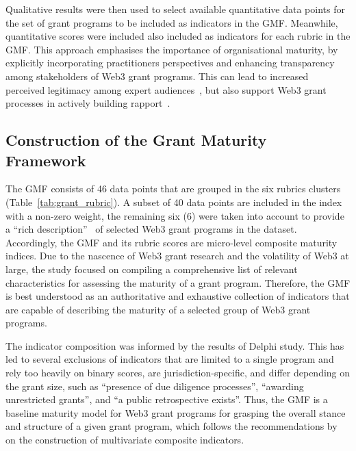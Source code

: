 \documentclass[conference]{IEEEtran}
\begin{document}
Qualitative results were then used to select available quantitative data points for the set of grant programs to be included as indicators in the GMF. Meanwhile, quantitative scores were included also included as indicators for each rubric in the GMF. This approach emphasises the importance of organisational maturity, by explicitly incorporating practitioners perspectives and enhancing transparency among stakeholders of Web3 grant programs. This can lead to increased perceived legitimacy among expert audiences~\cite[p.~116]{curtin_does_2006}, but also support Web3 grant processes in actively building rapport~\cite{suddaby_legitimacy_2017}.

\subsection{Construction of the Grant Maturity Framework}\label{sec_3.2}

The GMF consists of 46 data points that are grouped in the six rubrics clusters (Table~\ref{tab:grant_rubric}). A subset of 40 data points are included in the index with a non-zero weight, the remaining six (6) were taken into account to provide a ``rich description''~\cite[p.~197]{mcbride_sailing_2019} of selected Web3 grant programs in the dataset. Accordingly, the GMF and its rubric scores are micro-level composite maturity indices. Due to the nascence of Web3 grant research and the volatility of Web3 at large, the study focused on compiling a comprehensive list of relevant characteristics for assessing the maturity of a grant program. Therefore, the GMF is best understood as an authoritative and exhaustive collection of indicators that are capable of describing the maturity of a selected group of Web3 grant programs.

The indicator composition was informed by the results of Delphi study. This has led to several exclusions of indicators that are limited to a single program and rely too heavily on binary scores, are jurisdiction-specific, and differ depending on the grant size, such as ``presence of due diligence processes'', ``awarding unrestricted grants'', and ``a public retrospective exists''. Thus, the GMF is a baseline maturity model for Web3 grant programs for grasping the overall stance and structure of a given grant program, which follows the recommendations by~\cite{oecd_handbook_2008} on the construction of multivariate composite indicators.
\end{document}
